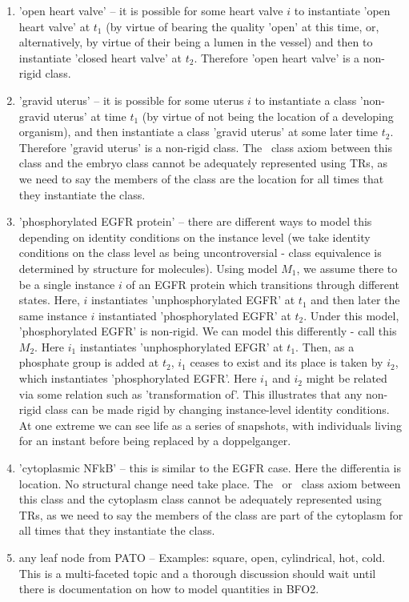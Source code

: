 \documentclass{bioinfo}
\begin{document}
\begin{enumerate}
  \item 'open heart valve' -- it is possible for some heart valve $i$
    to instantiate 'open heart valve' at $t_1$ (by virtue of bearing
    the quality 'open' at this time, or, alternatively, by virtue of
    their being a lumen in the vessel) and then to instantiate 'closed
    heart valve' at $t_2$. Therefore 'open heart valve' is a non-rigid
    class.

  \item 'gravid uterus' -- it is possible for some uterus $i$ to
    instantiate a class 'non-gravid uterus' at time $t_1$ (by virtue
    of not being the location of a developing organism), and then
    instantiate a class 'gravid uterus' at some later time
    $t_2$. Therefore 'gravid uterus' is a non-rigid class. The
    \ class axiom between this class and the embryo
    class cannot be adequately represented using TRs, as we need to
    say the members of the class are the location for all times that
    they instantiate the class.


  \item 'phosphorylated EGFR protein' -- there are different ways to
    model this depending on identity conditions on the instance level
    (we take identity conditions on the class level as being
    uncontroversial - class equivalence is determined by structure for
    molecules). Using model $M_1$, we assume there to be a single
    instance $i$ of an EGFR protein which transitions through
    different states. Here, $i$ instantiates 'unphosphorylated EGFR'
    at $t_1$ and then later the same instance $i$ instantiated
    'phosphorylated EGFR' at $t_2$. Under this model, 'phosphorylated
    EGFR' is non-rigid. We can model this differently - call this
    $M_2$. Here $i_1$ instantiates 'unphosphorylated EFGR' at
    $t_1$. Then, as a phosphate group is added at $t_2$, $i_1$ ceases
    to exist and its place is taken by $i_2$, which instantiates
    'phosphorylated EGFR'. Here $i_1$ and $i_2$ might be related via
    some relation such as 'transformation of'. This illustrates that
    any non-rigid class can be made rigid by changing instance-level
    identity conditions. At one extreme we can see life as a series of
    snapshots, with individuals living for an instant before being
    replaced by a doppelganger.

  \item 'cytoplasmic NFkB' -- this is similar to the EGFR case. Here
    the differentia is location. No structural change need take
    place. The \ or \ class axiom between
    this class and the cytoplasm class cannot be adequately
    represented using TRs, as we need to say the members of the class
    are part of the cytoplasm for all times that they instantiate the
    class.

  \item any leaf node from PATO -- Examples: square, open,
    cylindrical, hot, cold. This is a multi-faceted topic and a
    thorough discussion should wait until there is documentation on
    how to model quantities in BFO2.

\end{enumerate}
\end{document}
